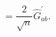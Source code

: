 \begin{equation}
[\hat{G}_{a}^{\prime},\hat{G}_{b}^{\prime}]
=\frac{2}{\sqrt{n}}\hat{G}_{ab}^{\prime}. 
\end{equation}

